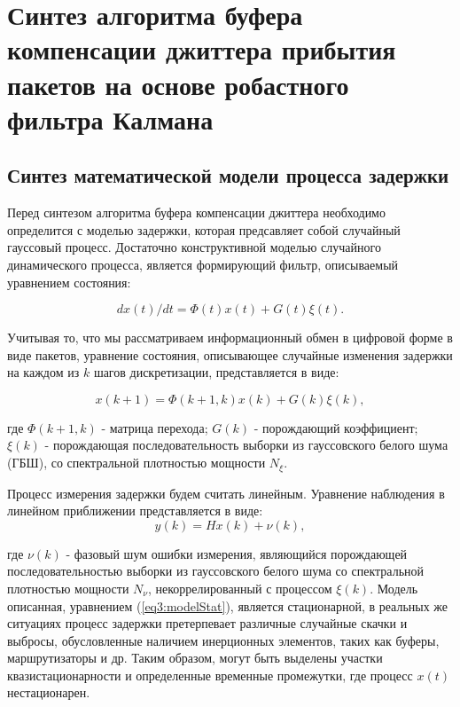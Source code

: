 \chapter{Синтез алгоритма буфера компенсации джиттера прибытия пакетов на основе робастного фильтра Калмана} \label{chapt3}

\section{Синтез математической модели процесса задержки} \label{sect3_1}
Перед синтезом алгоритма буфера компенсации джиттера необходимо определится с моделью задержки, которая предсавляет собой случайный гауссовый процесс. Достаточно конструктивной моделью случайного динамического процесса, является формирующий фильтр, описываемый уравнением состояния:

\begin{equation}\label{eq3:modelStatDif}
dx(t)/dt=\Phi(t)x(t)+G(t)\xi(t).
\end{equation}

Учитывая то, что мы рассматриваем информационный обмен в цифровой форме в виде пакетов, уравнение состояния, описывающее случайные изменения задержки на каждом из $k$ шагов дискретизации, представляется в виде:

\begin{equation}\label{eq3:modelStat}
x(k+1)=\Phi(k+1,k)x(k)+G(k)\xi(k),
\end{equation}

\noindent где $\Phi(k+1,k)$ - матрица перехода; $G(k)$ - порождающий коэффициент; $\xi(k)$ - порождающая последовательность выборки из гауссовского белого шума (ГБШ), со спектральной плотностью мощности $N_\xi$.

Процесс измерения задержки будем считать линейным. Уравнение наблюдения в линейном приближении представляется в виде:
\begin{equation}\label{eq3:Estim}
y(k)=Hx(k)+\nu(k),
\end{equation}

\noindent где $\nu(k)$ - фазовый шум ошибки измерения, являющийся порождающей последовательностью выборки из гауссовского белого шума со спектральной плотностью мощности $N_\nu$, некоррелированный с процессом $\xi(k)$. 
Модель описанная, уравнением (\ref{eq3:modelStat}), является стационарной, в реальных же ситуациях процесс задержки претерпевает различные случайные скачки и выбросы, обусловленные наличием инерционных элементов, таких как буферы, маршрутизаторы и др. Таким образом, могут быть выделены участки квазистационарности и определенные временные промежутки, где процесс $x(t)$ нестационарен.

